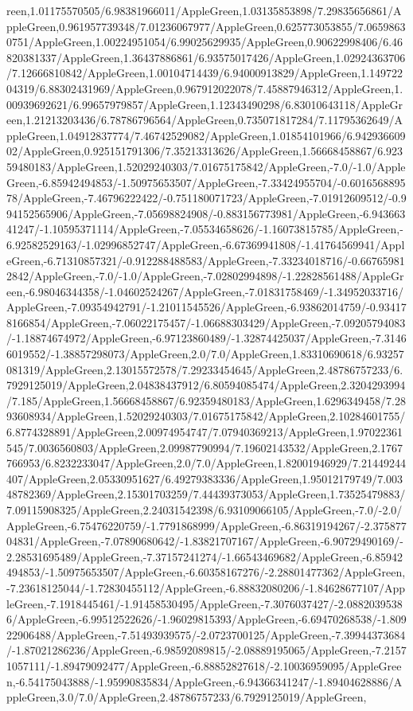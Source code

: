 {\begin{tikzternal}
reen,1.01175570505/6.98381966011/AppleGreen,1.03135853898/7.29835656861/AppleGreen,0.961957739348/7.01236067977/AppleGreen,0.625773053855/7.06598630751/AppleGreen,1.00224951054/6.99025629935/AppleGreen,0.90622998406/6.46820381337/AppleGreen,1.36437886861/6.93575017426/AppleGreen,1.02924363706/7.12666810842/AppleGreen,1.00104714439/6.94000913829/AppleGreen,1.14972204319/6.88302431969/AppleGreen,0.967912022078/7.45887946312/AppleGreen,1.00939692621/6.99657979857/AppleGreen,1.12343490298/6.83010643118/AppleGreen,1.21213203436/6.78786796564/AppleGreen,0.735071817284/7.11795362649/AppleGreen,1.04912837774/7.46742529082/AppleGreen,1.01854101966/6.94293660902/AppleGreen,0.925151791306/7.35213313626/AppleGreen,1.56668458867/6.92359480183/AppleGreen,1.52029240303/7.01675175842/AppleGreen,-7.0/-1.0/AppleGreen,-6.85942494853/-1.50975653507/AppleGreen,-7.33424955704/-0.601656889578/AppleGreen,-7.46796222422/-0.751180071723/AppleGreen,-7.01912609512/-0.994152565906/AppleGreen,-7.05698824908/-0.883156773981/AppleGreen,-6.94366341247/-1.10595371114/AppleGreen,-7.05534658626/-1.16073815785/AppleGreen,-6.92582529163/-1.02996852747/AppleGreen,-6.67369941808/-1.41764569941/AppleGreen,-6.71310857321/-0.912288488583/AppleGreen,-7.33234018716/-0.667659812842/AppleGreen,-7.0/-1.0/AppleGreen,-7.02802994898/-1.22828561488/AppleGreen,-6.98046344358/-1.04602524267/AppleGreen,-7.01831758469/-1.34952033716/AppleGreen,-7.09354942791/-1.21011545526/AppleGreen,-6.93862014759/-0.934178166854/AppleGreen,-7.06022175457/-1.06688303429/AppleGreen,-7.09205794083/-1.18874674972/AppleGreen,-6.97123860489/-1.32874425037/AppleGreen,-7.31466019552/-1.38857298073/AppleGreen,2.0/7.0/AppleGreen,1.83310690618/6.93257081319/AppleGreen,2.13015572578/7.29233454645/AppleGreen,2.48786757233/6.7929125019/AppleGreen,2.04838437912/6.80594085474/AppleGreen,2.3204293994/7.185/AppleGreen,1.56668458867/6.92359480183/AppleGreen,1.6296349458/7.2893608934/AppleGreen,1.52029240303/7.01675175842/AppleGreen,2.10284601755/6.8774328891/AppleGreen,2.00974954747/7.07940369213/AppleGreen,1.97022361545/7.0036560803/AppleGreen,2.09987790994/7.19602143532/AppleGreen,2.1767766953/6.8232233047/AppleGreen,2.0/7.0/AppleGreen,1.82001946929/7.21449244407/AppleGreen,2.05330951627/6.49279383336/AppleGreen,1.95012179749/7.00348782369/AppleGreen,2.15301703259/7.44439373053/AppleGreen,1.73525479883/7.09115908325/AppleGreen,2.24031542398/6.93109066105/AppleGreen,-7.0/-2.0/AppleGreen,-6.75476220759/-1.7791868999/AppleGreen,-6.86319194267/-2.37587704831/AppleGreen,-7.07890680642/-1.83821707167/AppleGreen,-6.90729490169/-2.28531695489/AppleGreen,-7.37157241274/-1.66543469682/AppleGreen,-6.85942494853/-1.50975653507/AppleGreen,-6.60358167276/-2.28801477362/AppleGreen,-7.23618125044/-1.72830455112/AppleGreen,-6.88832080206/-1.84628677107/AppleGreen,-7.1918445461/-1.91458530495/AppleGreen,-7.3076037427/-2.08820395386/AppleGreen,-6.99512522626/-1.96029815393/AppleGreen,-6.69470268538/-1.80922906488/AppleGreen,-7.51493939575/-2.0723700125/AppleGreen,-7.39944373684/-1.87021286236/AppleGreen,-6.98592089815/-2.08889195065/AppleGreen,-7.21571057111/-1.89479092477/AppleGreen,-6.88852827618/-2.10036959095/AppleGreen,-6.54175043888/-1.95990835834/AppleGreen,-6.94366341247/-1.89404628886/AppleGreen,3.0/7.0/AppleGreen,2.48786757233/6.7929125019/AppleGreen,
\end{tikzternal}}
